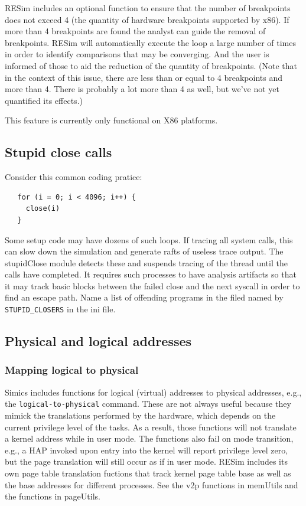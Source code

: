 \documentclass[titlepage]{article}
\begin{document}
\begin{appendices}
RESim includes an optional function to ensure that the number of breakpoints does not exceed 4 (the quantity of hardware breakpoints supported by x86).  If more than 4 breakpoints are found the analyst can guide the removal of breakpoints. RESim will automatically execute the loop a large number of times in order to identify comparisons that may be converging.  And the user is informed of those to aid the reduction of the quantity of breakpoints.  (Note that in the context of this issue, there are less than or equal to 4 breakpoints and more than 4.  There is probably a lot more than 4 as well, but we've not yet quantified its effects.)

This feature is currently only functional on X86 platforms.

\subsection{Stupid close calls}
\label{stupid-close}
Consider this common coding pratice:
\begin{verbatim}
   for (i = 0; i < 4096; i++) {
     close(i)
   }
\end{verbatim}
Some setup code may have dozens of such loops.  If tracing all system calls, this can slow down the simulation and generate rafts of useless trace output.
The stupidClose module detects these and suspends tracing of the thread until the calls have completed.  It requires such processes to have analysis artifacts so
that it may track basic blocks between the failed close and the next syscall in order to find an escape path.
Name a list of offending programs in the filed named by {\tt STUPID\_CLOSERS} in the ini file.

\subsection{Physical and logical addresses}
\subsubsection{Mapping logical to physical}
Simics includes functions for logical (virtual) addresses to physical addresses, e.g., 
the {\tt logical-to-physical} command.  These are not always useful because they mimick
the translations performed by the hardware, which depends on the current privilege level
of the tasks.  As a result, those functions will not translate a kernel address while in
user mode.  The functions also fail on mode transition, e.g., a HAP invoked upon entry into
the kernel will report privilege level zero, but the page translation will still occur as if
in user mode.  RESim includes its own page table translation fuctions that track kernel page
table base as well as the base addresses for different processes.  See the v2p functions
in memUtils and the functions in pageUtils.


\end{appendices}
\end{document}
